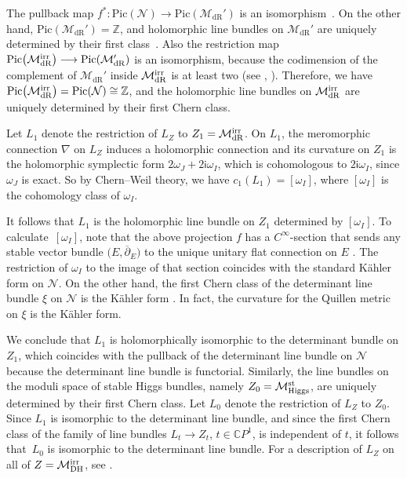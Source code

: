 \documentclass[pdftex]{sigma}
\numberwithin{equation}{section}
\theoremstyle{definition}
\newcommand\C{{\mathbb C}}
\renewcommand{\i}{\mathsf{i}}
\begin{document}
The pullback map $f^*\colon \mathrm{Pic}(\mathcal{N}) \longrightarrow \mathrm{Pic}(\mathcal{M}_{\mathrm{dR}}')$ is an isomorphism~\cite{BR}. On the other hand, $\mathrm{Pic}(\mathcal{M}_{\mathrm{dR}}') = {\mathbb Z}$, and holomorphic line bundles
on $\mathcal{M}_{\mathrm{dR}}'$ are uniquely determined by their first class~\cite{DN}.
Also the restriction map $\mathrm{Pic}\bigl(\mathcal{M}_{\mathrm{dR}}^{\rm irr}\bigr) \longrightarrow \mathrm{Pic}(\mathcal{M}_{\mathrm{dR}}')$ is an isomorphism,
because the codimension of the complement of $\mathcal{M}_{\mathrm{dR}}'$ inside $\mathcal{M}_{\mathrm{dR}}^{\rm irr}$ is at least two
(see \cite[p.~6, Lemma~3.1]{BMunoz2}, \cite[p.~202--203]{BMunoz1}).
Therefore, we have $\mathrm{Pic}\bigl(\mathcal{M}_{\mathrm{dR}}^{\rm irr}\bigr) = \mathrm{Pic}(\mathcal{N}) \cong \mathbb{Z}$, and
the holomorphic line bundles on $\mathcal{M}_{\mathrm{dR}}^{\rm irr}$ are uniquely determined by their first Chern class.

Let $L_1$ denote the restriction of $L_Z$ to $Z_1 = \mathcal{M}_{\mathrm{dR}}^{\rm irr}$. On $L_1$, the meromorphic connection
$\nabla$ on $L_Z$ induces a holomorphic connection and its curvature on $Z_1$ is the holomorphic symplectic
form $2\omega_J+2\i\omega_I$, which is cohomologous to $2\i\omega_I$, since $\omega_J$ is exact. So by
Chern--Weil theory, we have $c_1(L_1) = [\omega_I]$, where $[\omega_I]$ is the cohomology class of $\omega_I$.

It follows that $L_1$ is the holomorphic line bundle on $Z_1$ determined by $[\omega_I]$. To
calculate~$[\omega_I]$, note that the above projection $f$ has a $C^\infty$-section that sends
any stable vector bundle $\bigl(E, {\overline{\partial}}_E\bigr)$ to the unique unitary flat connection on $E$ \cite{NS}.
The restriction
of $\omega_I$ to the image of that section coincides with the standard K\"ahler form on $\mathcal{N}$.
On the other hand, the first Chern class of the determinant line bundle $\xi$ on $\mathcal{N}$ is the
K\"ahler form \cite{Qu}. In fact, the curvature for the Quillen metric on $\xi$ is the K\"ahler form.

We conclude that $L_1$ is holomorphically isomorphic to the determinant bundle on $Z_1$, which
coincides with the pullback of the determinant line bundle on $\mathcal{N}$ because the determinant
line bundle is functorial. Similarly, the line bundles on the moduli space of stable Higgs
bundles, namely $Z_0 = \mathcal{M}_{\mathrm{Higgs}}^{\rm st}$, are uniquely determined by their first Chern class. Let $L_0$
denote the restriction of $L_Z$ to $Z_0$. Since $L_1$ is isomorphic to the determinant line
bundle, and since the first Chern class of the family of line bundles $L_t \longrightarrow
Z_t$, $t \in \C
P^1$, is independent of $t$, it follows that~$L_0$ is isomorphic to the determinant line
bundle. For a description of $L_Z$ on all of $Z = \mathcal{M}_{\mathrm{DH}}^{\rm irr}$, see \cite[Section~3.7]{Hitchin-HKQK}.
\end{document}

